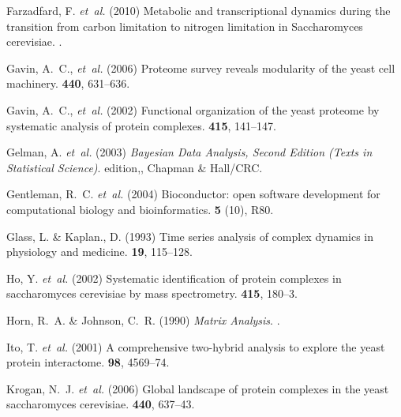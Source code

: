 \documentclass{bioinfo}
\begin{document}
\begin{thebibliography}{}
Farzadfard, F. {\em et~al.} (2010{\em{}})
  Metabolic and transcriptional dynamics during the transition from carbon
  limitation to nitrogen limitation in Saccharomyces cerevisiae.
.

Gavin, A.~C., {\em et~al.} (2006{\em{}}) Proteome survey reveals
  modularity of the yeast cell machinery.
 {\bf 440}, 631--636.

Gavin, A.~C., {\em et~al.} (2002{\em{}}) Functional
  organization of the yeast proteome by systematic analysis of protein
  complexes.
 {\bf 415}, 141--147.

Gelman, A. {\em et~al.} (2003{\em{}}) {\em
  Bayesian Data Analysis, Second Edition (Texts in Statistical Science)}.
 edition,, Chapman \& Hall/CRC.

Gentleman, R.~C. {\em et~al.} (2004{\em{}}) Bioconductor: open software development for
  computational biology and bioinformatics.
 {\bf 5} (10), R80.


Glass, L. \& Kaplan., D. (1993{\em{}}) Time series analysis of complex dynamics
  in physiology and medicine.
 {\bf 19}, 115--128.

Ho, Y. {\em et~al.} (2002{\em{}}) Systematic
  identification of protein complexes in saccharomyces cerevisiae by mass
  spectrometry.
 {\bf 415}, 180--3.

Horn, R.~A. \& Johnson, C.~R. (1990{\em{}}) {\em Matrix Analysis}.
.

Ito, T. {\em et~al.}
  (2001{\em{}}) A comprehensive two-hybrid analysis to explore the yeast
  protein interactome.
 {\bf 98}, 4569--74.

Krogan, N.~J. {\em et~al.} (2006{\em{}}) Global landscape of protein
  complexes in the yeast saccharomyces cerevisiae.
 {\bf 440}, 637--43.


\end{thebibliography}
\end{document}
